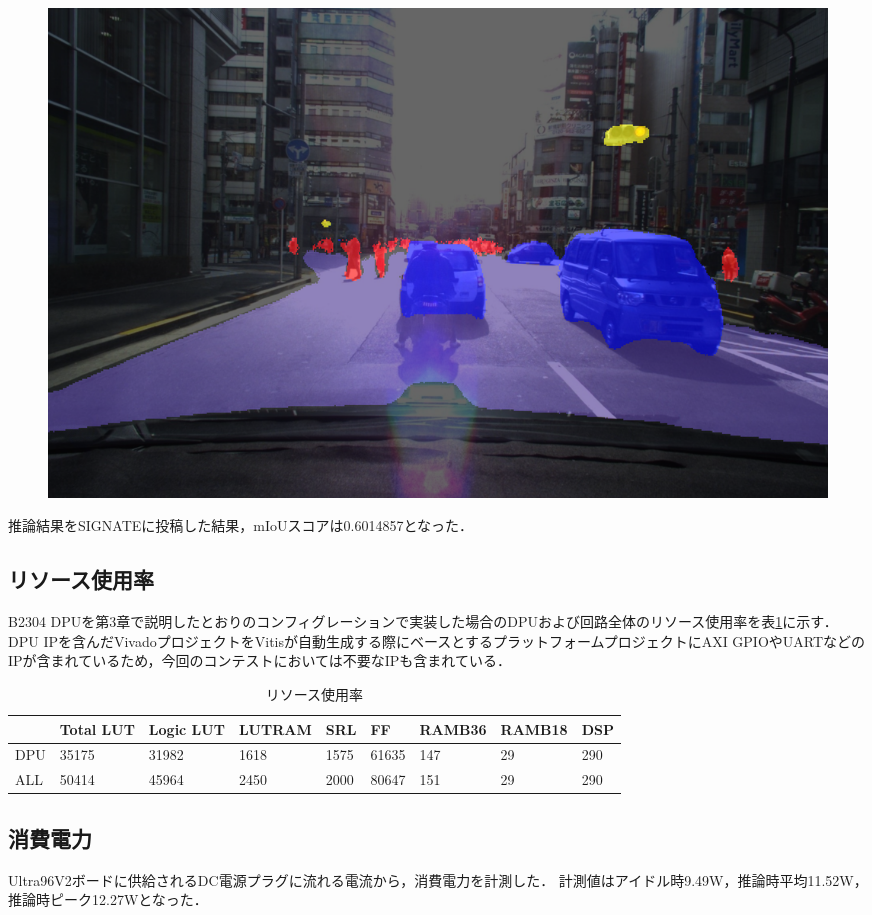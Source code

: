 \begin{figure}[h]
\begin{center}
\begin{minipage}{0.32\hsize}
\begin{center}
      \end{center}
    \end{minipage}
    \begin{minipage}{0.32\hsize}
      \begin{center}
        \includegraphics[width=\linewidth]{./figures/mixed.png}
      \end{center}
    \end{minipage}
  \end{center}
\end{figure}
推論結果をSIGNATEに投稿した結果，mIoUスコアは0.6014857となった．

\subsection{リソース使用率}
B2304 DPUを第3章で説明したとおりのコンフィグレーションで実装した場合のDPUおよび回路全体のリソース使用率を表\ref{resource_util}に示す．
DPU IPを含んだVivadoプロジェクトをVitisが自動生成する際にベースとするプラットフォームプロジェクトにAXI GPIOやUARTなどのIPが含まれているため，今回のコンテストにおいては不要なIPも含まれている．

\begin{table}[h]
    \begin{center}
        \label{resource_util}
        \caption{リソース使用率}
        \begin{tabular}{lllllllll}
            & Total LUT & Logic LUT & LUTRAM & SRL  & FF    & RAMB36 & RAMB18 & DSP \\ \hline
        DPU & 35175     & 31982     & 1618   & 1575 & 61635 & 147    & 29     & 290 \\ \hline
        ALL & 50414     & 45964     & 2450   & 2000 & 80647 & 151    & 29     & 290
        \end{tabular}
    \end{center}
\end{table}
\subsection{消費電力}
Ultra96V2ボードに供給されるDC電源プラグに流れる電流から，消費電力を計測した．
計測値はアイドル時9.49W，推論時平均11.52W，推論時ピーク12.27Wとなった．
